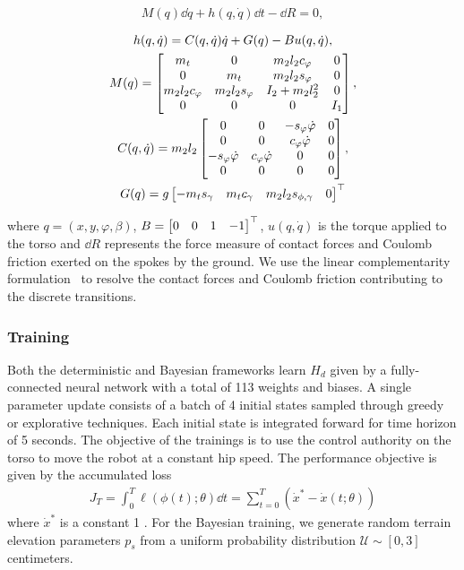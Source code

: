 \begin{equation}
  M(q) \dd \dot{q} + h(q, \dot{q})\dd t - \dd R  = 0,
  \label{eq:dynamics}
\end{equation}

\begin{equation*}
  \begin{gathered}
    h(q, \dot{q}) = C(q, \dot{q})\dot{q} + G(q) - Bu(q, \dot{q}),\\
    M(q) = \begin{bmatrix}m_t & 0 & m_2 l_2 c_{\varphi} & 0 \\ 0 & m_t & m_2 l_2 s_{\varphi} & 0 \\
            m_2 l_2 c_{\varphi} & m_2 l_2 s_{\varphi} & I_2+m_2 l_2^2 & 0 \\
            0 & 0 & 0 & I_1\end{bmatrix}, \\
    C(q,\dot{q}) = m_2l_2 \begin{bmatrix}0 & 0 & -s_{\varphi} \dot{\varphi} & 0\\ 
                    0 & 0 & c_{\varphi} \dot{\varphi} & 0 \\ 
                    -s_{\varphi} \dot{\varphi} & c_{\varphi} \dot{\varphi} & 0 & 0 \\
                    0 & 0 & 0 & 0\end{bmatrix}, \\
    G(q) = g\begin{bmatrix}-m_t s_{\gamma} & 
                  m_t c_{\gamma} &
                  m_2 l_2 s_{\phi,\gamma} &
                  0\end{bmatrix}^\top \\
  \end{gathered}
\end{equation*}

\noindent where $q = (x, y, \varphi, \beta)$, $B = \begin{bmatrix}0 & 0 & 1 & -1\end{bmatrix}^\top$,
$u(q, \dot{q})$ is the torque applied to the torso and $\dd R$ represents the
force measure of contact forces and Coulomb friction exerted on the spokes by
the ground. We use the linear complementarity
formulation~\cite{glocker2005formulation} to resolve the contact forces and
Coulomb friction contributing to the discrete transitions.


\subsubsection{Training}
\label{sssec:training}

Both the deterministic and Bayesian frameworks learn $H_d$ given by a
fully-connected neural network with a total of 113 weights and biases.   
%
A single parameter update consists of a batch of 4 initial states sampled
through greedy or explorative techniques.
%
Each initial state is integrated forward for time horizon of 5 seconds.
%
The objective of the trainings is to use the control authority on the torso to
move the robot at a constant hip speed.
%
The performance objective is given by the accumulated loss
\begin{align}
    J_T = \int_0^{T} \ell(\phi(t); \theta) \dd t = \sum_{t=0}^{T} (\dot{x}^* - \dot{x}(t; \theta))
    \label{eq:loss}
\end{align}
\noindent where $\dot{x}^*$ is a constant 1 .
%
For the Bayesian training, we generate random terrain elevation parameters $p_s$
from a uniform probability distribution $\mathcal{U} \sim[0, 3]$ centimeters.


